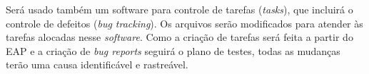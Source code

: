 \documentclass[]{article}
\begin{document}
Será usado também um software para controle de tarefas (\emph{tasks}), que incluirá o controle de defeitos (\emph{bug tracking}). Os arquivos serão modificados para atender às tarefas alocadas nesse \emph{software}. Como a criação de tarefas será feita a partir do EAP e a criação de \emph{bug reports} seguirá o plano de testes, todas as mudanças terão uma causa identificável e rastreável.


%
%
\end{document}
